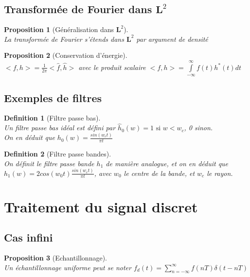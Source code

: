 \documentclass[a4paper]{article}
\newtheorem*{prop}{Proposition}
\newtheorem*{definition}{Definition}
\renewcommand{\(}{\left(}
\renewcommand{\)}{\right)}
\begin{document}
\subsection{Transformée de Fourier dans $\mathbf{L}^2$}

\begin{prop}[Généralisation dans $\mathbf{L}^2$]~\\
  La transformée de Fourier s'étends dans $\mathbf{L}^2$ par argument de densité
\end{prop}

\begin{prop}[Conservation d'énergie]~\\
  $<f,h> = \frac{1}{2\pi}<\hat{f},\hat{h}>$ avec le produit scalaire
  $<f,h> = \int\limits_{-\infty}^{\infty}f(t)h^*(t)dt$
\end{prop}

\subsection{Exemples de filtres}

\begin{definition}[Filtre passe bas]~\\
  Un filtre passe bas idéal est défini par $\hat{h}_0(w) = 1 \text{ si } w < w_c$, 0 sinon.\\
  On en déduit que $h_0(w) = \frac{sin(w_ct)}{\pi t}$
\end{definition}

\begin{definition}[Filtre passe bandes]~\\
  On définit le filtre passe bande $h_1$ de manière analogue, et on en déduit
  que $h_1(w) = 2cos(w_0t)\frac{sin(w_ct)}{\pi t}$, avec $w_0$ le centre de la bande, et $w_c$ le rayon.
\end{definition}

\section{Traitement du signal discret}

\subsection{Cas infini}

\begin{prop}[Echantillonnage]~\\
  Un échantillonnage uniforme peut se noter $f_d(t) = \sum\limits_{n=-\infty}^{\infty}f(nT)\delta(t - nT)$
\end{prop}
\end{document}
